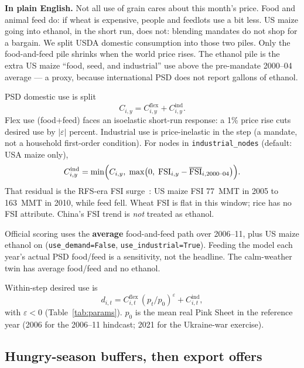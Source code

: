 \textbf{In plain English.} Not all use of grain cares about this month's
price. Food and animal feed do: if wheat is expensive, people and feedlots
use a bit less. US maize going into ethanol, in the short run, does not:
blending mandates do not shop for a bargain. We split USDA domestic
consumption into those two piles. Only the food-and-feed pile shrinks when
the world price rises. The ethanol pile is the extra US maize ``food, seed,
and industrial'' use above the pre-mandate 2000--04 average --- a proxy,
because international PSD does not report gallons of ethanol.

PSD domestic use is split
\begin{equation}
C_{i,y}=C^{\mathrm{flex}}_{i,y}+C^{\mathrm{ind}}_{i,y}.
\end{equation}
Flex use (food+feed) faces an isoelastic short-run response: a 1\% price
rise cuts desired use by $|\varepsilon|$ percent. Industrial use is
price-inelastic in the step (a mandate, not a household first-order
condition). For nodes in \texttt{industrial\_nodes} (default: USA maize
only),
\begin{equation}
\label{eq:industrial}
C^{\mathrm{ind}}_{i,y}=\min\Bigl(C_{i,y},\;
\max\bigl(0,\;\mathrm{FSI}_{i,y}-\overline{\mathrm{FSI}}_{i,2000\text{--}04}\bigr)\Bigr).
\end{equation}
That residual is the RFS-era FSI surge~\citep{rfs2005,abbott2011,roberts2013}:
US maize FSI 77~MMT in 2005 to 163~MMT in 2010, while feed fell. Wheat FSI is
flat in this window; rice has no FSI attribute. China's FSI trend is
\emph{not} treated as ethanol.

Official scoring uses the \textbf{average} food-and-feed path over 2006--11,
plus US maize ethanol on (\texttt{use\_demand=False},
\texttt{use\_industrial=True}). Feeding the model each year's actual PSD
food/feed is a sensitivity, not the headline. The calm-weather twin has
average food/feed and no ethanol.

Within-step desired use is
\begin{equation}
\label{eq:desired}
d_{i,t}=C^{\mathrm{flex}}_{i,t}\,(p_t/p_0)^{\varepsilon}+C^{\mathrm{ind}}_{i,t},
\end{equation}
with $\varepsilon<0$ (Table~\ref{tab:params}). $p_0$ is the mean real Pink
Sheet in the reference year (2006 for the 2006--11 hindcast; 2021 for the
Ukraine-war exercise).

\subsection{Hungry-season buffers, then export offers}
\label{sec:lean}

